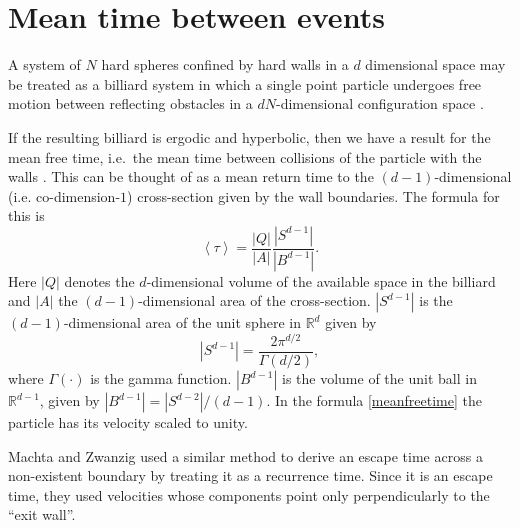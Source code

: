 \documentclass[a4paper,10pt]{article}
\newcommand{\mean}[1]{\left \langle #1 \right \rangle}
\newcommand{\RR}{\mathbb{R}}
\begin{document}
 

\section{Mean time between events}

A system of $N$ hard spheres confined by hard walls in a $d$ dimensional
space may be treated as a billiard system 
in which a single point  particle undergoes free motion between reflecting obstacles 
in a $ d N $-dimensional configuration space \cite{Sinai70, MarkChern}. 

If the resulting billiard is ergodic and hyperbolic, then we
have a result for the mean free time, i.e.\ the mean time between 
collisions of the particle with the walls \cite{MarkChern}. 
This can be thought of as a mean return time to the $(d-1)$-dimensional 
(i.e. co-dimension-$1$) cross-section given by the wall boundaries.
The formula for this is
\begin{equation}\label{meanfreetime}
 \mean{\tau} = \frac{|Q|}{|A|} \frac{|S^{d-1}|}{|B^{d-1}|}.
\end{equation}
Here $|Q|$ denotes the $d$-dimensional volume of the available 
space in the billiard and 
$|A|$ the $(d-1)$-dimensional area of the cross-section.
 $|S^{d-1}|$ is the $(d-1)$-dimensional area of the unit sphere in $\RR^d$ given by
\begin{equation}
  |S^{d-1}| = \frac{2 \pi^{d/2}}{\Gamma(d/2)},
\end{equation}
where $\Gamma(\cdot)$ is the gamma function. 
$|B^{d-1}|$ is the volume of the unit ball 
in $\RR^{d-1}$, given by $|B^{d-1}| = |S^{d-2}| / (d-1)$.
In the formula \ref{meanfreetime}  the particle has 
its velocity scaled to unity.

Machta and Zwanzig \cite{MachtaZwan} used a similar method to derive an escape 
time across a non-existent boundary by treating it as a recurrence time.
Since it is an escape time, they used velocities whose components point only 
perpendicularly to the ``exit wall''.
\end{document}
